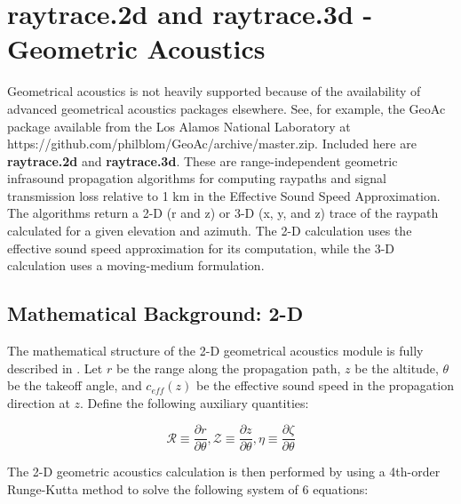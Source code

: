 \section{raytrace.2d and raytrace.3d - Geometric Acoustics}

Geometrical acoustics is not heavily supported because of the availability of advanced geometrical acoustics packages elsewhere. See, for example, the GeoAc package available from the Los Alamos National Laboratory at https://github.com/philblom/GeoAc/archive/master.zip. Included here are {\bf raytrace.2d} and {\bf raytrace.3d}. These are range-independent geometric infrasound propagation algorithms for computing raypaths and signal transmission loss relative to 1 km in the Effective Sound Speed Approximation. The algorithms return a 2-D (r and z) or 3-D (x, y, and z) trace of the raypath calculated for a given elevation and azimuth.  The 2-D calculation uses the effective sound speed approximation for its computation, while the 3-D calculation uses a moving-medium formulation.

\subsection{Mathematical Background: 2-D}
\label{sec: raytrace.2d math}

The mathematical structure of the 2-D geometrical acoustics module is fully described in \cite{blom_jasa}.  Let $r$ be the range along the propagation path, $z$ be the altitude, $\theta$ be the takeoff angle, and $c_{eff}(z)$ be the effective sound speed in the propagation direction at $z$.  Define the following auxiliary quantities:

\begin{equation}
\mathcal{R}\equiv\frac{\partial r}{\partial\theta},
\mathcal{Z}\equiv\frac{\partial z}{\partial\theta},
\eta\equiv\frac{\partial\zeta}{\partial\theta}
\end{equation}

The 2-D geometric acoustics calculation is then performed by using a 4th-order Runge-Kutta method to solve the following system of 6 equations:

